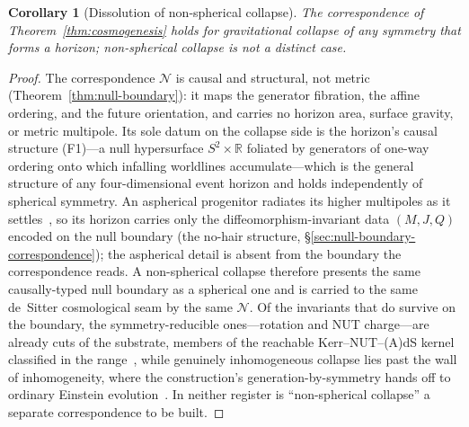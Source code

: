 \documentclass[11pt,a4paper]{article}
\theoremstyle{plain}
\newtheorem{corollary}{Corollary}
\theoremstyle{definition}
\theoremstyle{remark}
\begin{document}
\begin{corollary}[Dissolution of non-spherical collapse]\label{cor:nonspherical}
The correspondence of Theorem~\ref{thm:cosmogenesis} holds for gravitational collapse of any symmetry that forms a horizon; non-spherical collapse is not a distinct case.
\end{corollary}

\begin{proof}
The correspondence $\mathcal{N}$ is causal and structural, not metric (Theorem~\ref{thm:null-boundary}): it maps the generator fibration, the affine ordering, and the future orientation, and carries no horizon area, surface gravity, or metric multipole. Its sole datum on the collapse side is the horizon's causal structure (F1)---a null hypersurface $S^2\times\mathbb{R}$ foliated by generators of one-way ordering onto which infalling worldlines accumulate---which is the general structure of any four-dimensional event horizon and holds independently of spherical symmetry. An aspherical progenitor radiates its higher multipoles as it settles~\cite{Price1972}, so its horizon carries only the diffeomorphism-invariant data $(M,J,Q)$ encoded on the null boundary (the no-hair structure, \S\ref{sec:null-boundary-correspondence}); the aspherical detail is absent from the boundary the correspondence reads. A non-spherical collapse therefore presents the same causally-typed null boundary as a spherical one and is carried to the same de~Sitter cosmological seam by the same $\mathcal{N}$. Of the invariants that do survive on the boundary, the symmetry-reducible ones---rotation and NUT charge---are already cuts of the substrate, members of the reachable Kerr--NUT--(A)dS kernel classified in the range~\cite{JanzenRange}, while genuinely inhomogeneous collapse lies past the wall of inhomogeneity, where the construction's generation-by-symmetry hands off to ordinary Einstein evolution~\cite{JanzenRange,JanzenDynamics}. In neither register is ``non-spherical collapse'' a separate correspondence to be built.
\end{proof}
\end{document}
